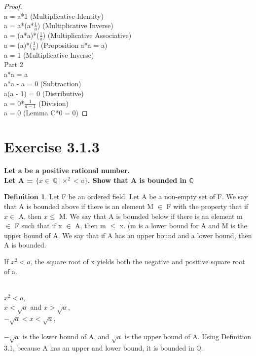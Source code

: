 \documentclass[12pt]{article}
\providecommand{\x}{\times}
\theoremstyle{definition}
\newtheorem{definition}[theorem]{Definition}
\numberwithin{equation}{subsection}
\begin{document}
\begin{proof}
\\ a = a*1 (Multiplicative Identity)
\\ a = a*(a*$\frac{1}{a}$) (Multiplicative Inverse)
\\ a = (a*a)*($\frac{1}{a}$) (Multiplicative Associative)
\\ a = (a)*($\frac{1}{a}$) (Proposition a*a = a)
\\ a = 1 (Multiplicative Inverse)
\\ Part 2
\\ a*a = a
\\ a*a - a = 0 (Subtraction)
\\ a(a - 1) = 0 (Distributive)
\\ a = 0*$\frac{1}{a-1}$ (Division)
\\ a = 0 (Lemma C*0 = 0)
\end{proof}

\section{Exercise 3.1.3}
\textbf{Let a be a positive rational number. \\
Let A = $\{x \in\ \mathbb Q\ |\x^2 < a\}$. Show that A is bounded in $\mathbb Q$\.}

\begin{definition}
Let F be an ordered field. Let A be a non-empty set of F. We say that A is bounded above if there is an element M $\in$ F with the property that if $x \in $ A, then $x \leq$ M. We say that A is bounded below if there is an element m $\in$ F such that if x $\in$ A, then m $\leq$ x. (m is a lower bound for A and M is the upper bound of A. We say that if A has an upper bound and a lower bound, then A is bounded.
\end{definition}
If $x^2 < a$, the square root of x yields both the negative and positive square root of a. 
\begin{center}
\\
$x^2 < a$,
\\
$x < \sqrt{a}$ and $x > \sqrt{a}$,
\\
$-\sqrt{a} < x < \sqrt{a}$,
\end{center}
$-\sqrt{a}$ is the lower bound of A, and $\sqrt{a}$ is the upper bound of A. Using Definition 3.1, because A has an upper and lower bound, it is bounded in $\mathbb Q$.
\end{document}
